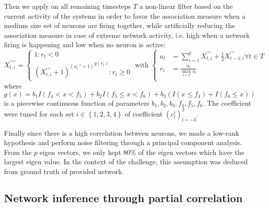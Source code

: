 \documentclass[wcp]{jmlr}
\begin{document}
Then we apply on all remaining timesteps $T$ a non-linear filter based on the current
activity of the systems in order to favor the association measure when
a medium size set of neurons are firing together, while artificially
reducing the association measure in case of extreme network activity,
i.e. high when a network firing is happening and low when no neuron is
active:
\begin{equation}
X^{\prime\prime\prime\prime}_{t,i} =
\left\{
  \begin{array}{l}
    1  : r_t < 0\\
    {(X^{\prime\prime\prime}_{t,i} + 1)^{(a_t^{-1} + 1)}}^{g(r_t)} : r_t \geq 0
  \end{array}
\right.
\text{ with }
\left\{
  \begin{array}{ll}
    a_t &= \sum_{i=1}^p X^{\prime\prime\prime}_{t,i} +
                       \frac{1}{2} X^{\prime\prime\prime}_{t-1,i} \forall t \in T\\
    r_t &= \frac{a_t}{\max_{l \in T}{a_l}} \\
  \end{array}
\right.
\end{equation}
where $g(x) = b_1 I(f_4 < x < f_5) + b_2  I(f_5 \leq x < f_6) +
b_3 (I(x\leq f_4) + I(f_ 6 \leq x))$ is a piecewise continuous function of
parameters $b_1, b_2, b_3, f_4, f_5, f_6$. The coefficient were tuned
for each set $i\in\left\{1, 2, 3, 4\right\}$ of coefficient
$\left(c_l^i\right)_{l=-3}^2$.

Finally since there is a high correlation between neurons, we made a
low-rank hypothesis and perform noise filtering through a principal component
analysis. From the $p$ eigen vectors, we only kept $80\%$ of
the eigen vectors which have the largest eigen value. In the context of the
challenge, this assumption was deduced from ground truth of provided network.

\subsection{Network inference through partial correlation}
\label{sec:inference}

\end{document}
